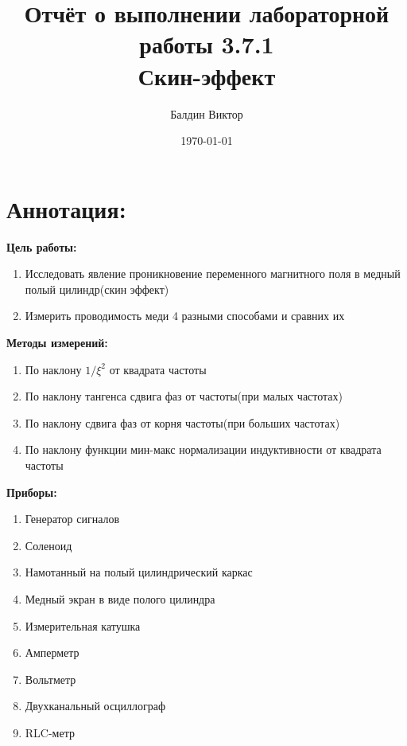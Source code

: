 \documentclass{article}
\title{\textbf{Отчёт о выполнении лабораторной  работы 3.7.1} \\
                 Скин-эффект}
\author{Балдин Виктор}
\date{\today}
\begin{document}
\maketitle
\newpage
\section{Аннотация:}
\noindent \textbf{Цель работы:}
\begin{enumerate}
  \item Исследовать явление проникновение переменного магнитного поля в медный полый цилиндр(скин эффект) %
  \item Измерить проводимость меди 4 разными способами и сравних их
\end{enumerate}

\noindent \textbf{Методы измерений:}

\begin{enumerate}
    \item По наклону $1/\xi^2 $ от квадрата частоты
    \item По наклону тангенса сдвига фаз от частоты(при малых частотах)
    \item По наклону сдвига фаз от корня частоты(при больших частотах)
    \item По наклону функции мин-макс нормализации индуктивности от квадрата частоты
\end{enumerate}

\noindent\textbf{Приборы:} \\

\begin{enumerate}
    \item Генератор сигналов
    \item Соленоид
    \item Намотанный на полый цилиндрический каркас
    \item Медный экран в виде полого цилиндра
    \item Измерительная катушка
    \item Ам­перметр
    \item Вольтметр
    \item Двухканальный осциллограф
    \item RLC-метр
\end{enumerate}

\end{document}
